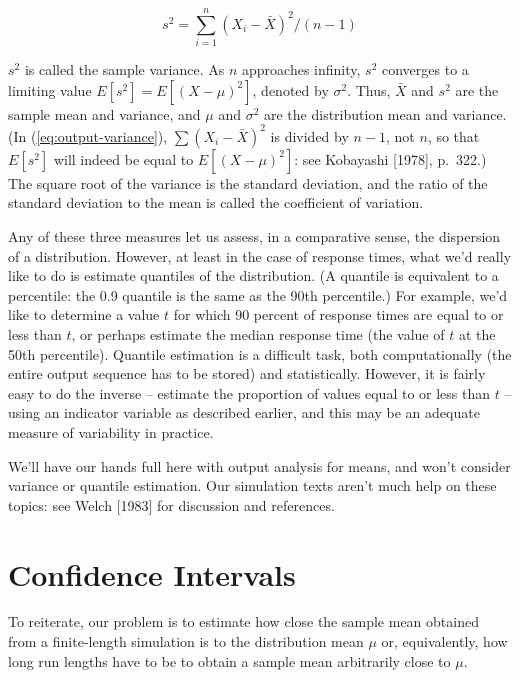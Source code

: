 \begin{equation}
s^2 = \sum_{i=1}^{n} (X_i - \bar{X})^2 / (n - 1)
\label{eq:output-variance}
\end{equation}

$s^2$ is called the sample variance. As $n$ approaches infinity, $s^2$
converges to a limiting value $E[s^2] = E[(X - \mu)^2]$, denoted by $\sigma^2$.
Thus, $\bar{X}$ and $s^2$ are the sample mean and variance, and $\mu$ and
$\sigma^2$ are the distribution mean and variance. (In
(\ref{eq:output-variance}), $\sum (X_i - \bar{X})^2$ is divided by $n - 1$, not
$n$, so that $E[s^2]$ will indeed be equal to $E[(X - \mu)^2]$: see Kobayashi
[1978], p.\ 322.) The square root of the variance is 
\noindent the standard deviation, and the ratio of the standard deviation to the mean is called the coefficient
of variation.

Any of these three measures let us assess, in a comparative sense, the
dispersion of a distribution. However, at least in the case of response times,
what we'd really like to do is estimate quantiles of the distribution. (A
quantile is equivalent to a percentile: the 0.9 quantile is the same as the
90th percentile.) For example, we'd like to determine a value $t$ for which 90
percent of response times are equal to or less than $t$, or perhaps estimate
the median response time (the value of $t$ at the 50th percentile). Quantile
estimation is a difficult task, both computationally (the entire output
sequence has to be stored) and statistically. However, it is fairly easy to do
the inverse -- estimate the proportion of values equal to or less than $t$ --
using an indicator variable as described earlier, and this may be an adequate
measure of variability in practice.

We'll have our hands full here with output analysis for means, and won't
consider variance or quantile estimation. Our simulation texts aren't much help
on these topics: see Welch [1983] for discussion and references.

\section{Confidence Intervals}
\label{sec:confidence-intervals}

To reiterate, our problem is to estimate how close the sample mean obtained
from a finite-length simulation is to the distribution mean $\mu$ or,
equivalently, how long run lengths have to be to obtain a sample mean
arbitrarily close to $\mu$.

